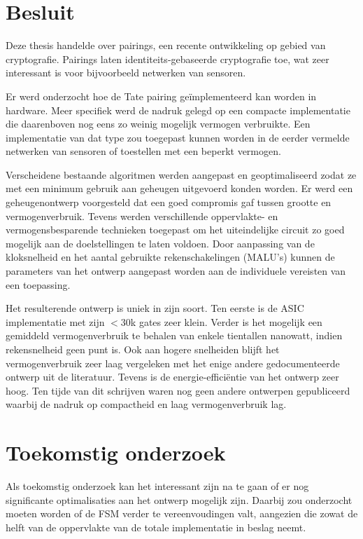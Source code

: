 
\section{Besluit}

Deze thesis handelde over pairings, een recente ontwikkeling op gebied van cryptografie. Pairings laten identiteits-gebaseerde cryptografie toe, wat zeer interessant is voor bijvoorbeeld netwerken van sensoren.

Er werd onderzocht hoe de Tate pairing ge\"implementeerd kan worden in hardware. Meer specifiek werd de nadruk gelegd op een compacte implementatie die daarenboven nog eens zo weinig mogelijk vermogen verbruikte. Een implementatie van dat type zou toegepast kunnen worden in de eerder vermelde netwerken van sensoren of toestellen met een beperkt vermogen.

Verscheidene bestaande algoritmen werden aangepast en geoptimaliseerd zodat ze met een minimum gebruik aan geheugen uitgevoerd konden worden. Er werd een geheugenontwerp voorgesteld dat een goed compromis gaf tussen grootte en vermogenverbruik. Tevens werden verschillende oppervlakte- en vermogensbesparende technieken toegepast om het uiteindelijke circuit zo goed mogelijk aan de doelstellingen te laten voldoen. Door aanpassing van de kloksnelheid en het aantal gebruikte rekenschakelingen (MALU's) kunnen de parameters van het ontwerp aangepast worden aan de individuele vereisten van een toepassing.

Het resulterende ontwerp is uniek in zijn soort. Ten eerste is de ASIC implementatie met zijn $<$30k gates zeer klein. Verder is het mogelijk een gemiddeld vermogenverbruik te behalen van enkele tientallen nanowatt, indien rekensnelheid geen punt is. Ook aan hogere snelheiden blijft het vermogenverbruik zeer laag vergeleken met het enige andere gedocumenteerde ontwerp uit de literatuur. Tevens is de energie-effici\"entie van het ontwerp zeer hoog. Ten tijde van dit schrijven waren nog geen andere ontwerpen gepubliceerd waarbij de nadruk op compactheid en laag vermogenverbruik lag.

\section{Toekomstig onderzoek}

Als toekomstig onderzoek kan het interessant zijn na te gaan of er nog significante optimalisaties aan het ontwerp mogelijk zijn. Daarbij zou onderzocht moeten worden of de FSM verder te vereenvoudingen valt, aangezien die zowat de helft van de oppervlakte van de totale implementatie in beslag neemt.

